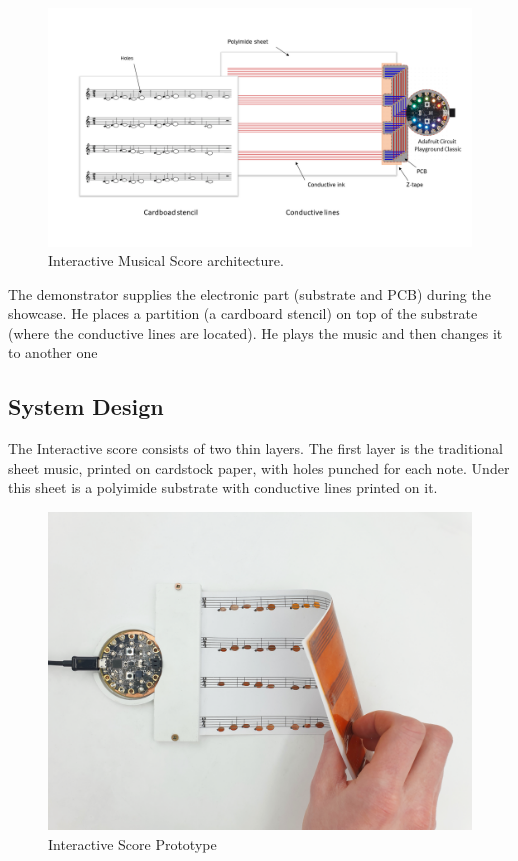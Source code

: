 \begin{figure}[h]
    \centering
    \includegraphics{images/IS_schema.png}
    \caption{Interactive Musical Score architecture.}
    \label{fig:IS_schema}
\end{figure}

The demonstrator supplies the electronic part (substrate and PCB) during the
showcase. He places a partition (a cardboard stencil) on top of the substrate (where
the conductive lines are located). He plays the music and then changes it to another
one

\subsection{System Design}

The Interactive score consists of two thin layers. The first layer is the traditional sheet
music, printed on cardstock paper, with holes punched for each note. Under this sheet
is a polyimide substrate with conductive lines printed on it. 


\begin{figure}[h]
    \centering
    \includegraphics{images/IS_demo.png}
    \caption{Interactive Score Prototype}
    \label{fig:IS_demo}
\end{figure}

